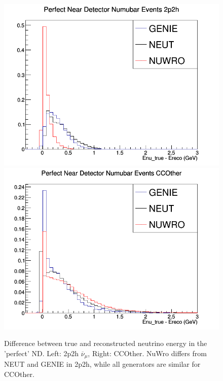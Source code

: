 \documentclass[12pt]{article}
\begin{document}
\begin{figure}[h]
\centering
{}
\includegraphics[width=\linewidth]{Ereco_Etrue/numubar_perfect_ND_2p2h.png}
\endminipage
{}
\includegraphics[width=\linewidth]{Ereco_Etrue/numubar_perfect_ND_CCOther.png}
\endminipage
\caption{Difference between true and reconstructed neutrino energy in the 'perfect' ND. Left: 2p2h $\overline{\nu}_\mu$, Right: CCOther. NuWro differs from NEUT and GENIE in 2p2h, while all generators are similar for CCOther.}
\label{fig:numubar_Etrue_ereco_perfect}
\end{figure}
\FloatBarrier
\end{document}
